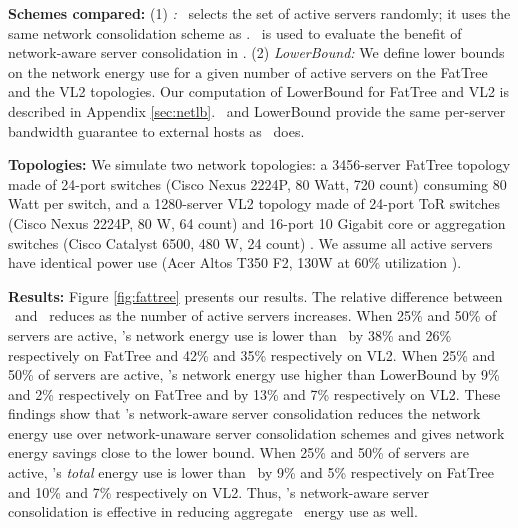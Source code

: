 \textbf{Schemes compared:}   (1) \emph{\randSN:} \randSN\ selects the set of active servers randomly; it uses the same network consolidation scheme as \shrink.  \randSN\ is used to evaluate the benefit of network-aware server consolidation in \shrink. (2) \emph{LowerBound:} We define lower bounds on the network energy use for a given number of active servers on the FatTree and the VL2 topologies. Our computation of LowerBound for FatTree and VL2 is described in Appendix \ref{sec:netlb}. \randSN\ and LowerBound provide the same per-server bandwidth guarantee to external hosts as \shrink\ does.

\textbf{Topologies:}  We simulate two network topologies:  a 3456-server FatTree topology made of 24-port switches (Cisco Nexus 2224P, 80 Watt, 720 count) \cite{cisco-dc-switches} consuming 80 Watt per switch, and a 1280-server VL2 topology made of 24-port ToR switches (Cisco Nexus 2224P, 80 W, 64 count) \cite{cisco-dc-switches} and 16-port 10 Gigabit core or aggregation switches (Cisco Catalyst 6500, 480 W, 24 count) \cite{catalyst-6500}. We assume all active servers have identical power use (Acer Altos T350 F2, 130W at 60\% utilization \cite{spec}).

\textbf{Results:}  Figure \ref{fig:fattree} presents our results.
The relative difference between \shrink\ and \randSN\ reduces as the number of active servers increases. 
When 25\% and 50\% of servers are active, \shrink's network energy use is lower than \randSN\ by 38\% and 26\% respectively on FatTree and 42\% and 35\% respectively on VL2. 
When 25\% and 50\% of servers are active, \shrink's network energy use higher than LowerBound by 9\% and 2\% respectively on FatTree and by 13\% and 7\% respectively on VL2. 
These findings show that \shrink's network-aware server consolidation reduces the network energy use over network-unaware server consolidation schemes and gives network energy savings close to the lower bound.
When 25\% and 50\% of servers are active, \shrink's \emph{total} energy use is lower than \randSN\ by 9\% and 5\% respectively on FatTree and 10\% and 7\% respectively on VL2. 
Thus, \shrink's network-aware server consolidation is effective in reducing aggregate \cdc\ energy use as well. 



